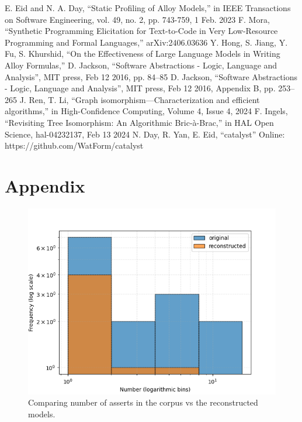 \documentclass[conference]{IEEEtran}
\begin{document}
\begin{thebibliography}{00}
 E. Eid and N. A. Day, ``Static Profiling of Alloy Models,'' in IEEE Transactions on Software Engineering, vol. 49, no. 2, pp. 743-759, 1 Feb. 2023 
 F. Mora, ``Synthetic Programming Elicitation for Text-to-Code in Very Low-Resource Programming and Formal Languages,'' arXiv:2406.03636
 Y. Hong, S. Jiang, Y. Fu, S. Khurshid, ``On the Effectiveness of Large Language Models in Writing Alloy Formulas,''
 D. Jackson, ``Software Abstractions - Logic, Language and Analysis'', MIT press, Feb 12 2016, pp. 84--85
 D. Jackson, ``Software Abstractions - Logic, Language and Analysis'', MIT press, Feb 12 2016, Appendix B, pp. 253--265
 J. Ren, T. Li, ``Graph isomorphism—Characterization and efficient algorithms,'' in High-Confidence Computing, Volume 4, Issue 4, 2024
 F. Ingels, ``Revisiting Tree Isomorphism: An Algorithmic Bric-à-Brac,'' in HAL Open Science, hal-04232137, Feb 13 2024
 N. Day, R. Yan, E. Eid, ``catalyst'' Online: https://github.com/WatForm/catalyst
\end{thebibliography}


\section{Appendix}


\begin{figure}[htbp]
    \centerline{\includegraphics[width=\linewidth]{"./Comparing number of asserts in the corpus vs the reconstructed models.png"}}
    \caption{Comparing number of asserts in the corpus vs the reconstructed models.}
    \label{fig}
    \end{figure}
    
\end{document}
